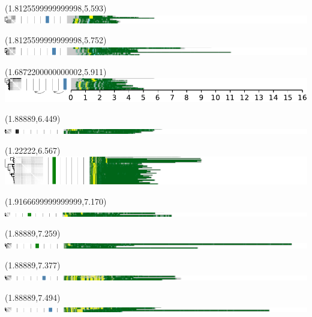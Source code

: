 \documentclass{article}
\begin{document}
\begin{textblock}{13}(1.8125599999999998,5.593)\includegraphics{./Figure_S5/chr11-HG005.pdf}\end{textblock}
\begin{textblock}{13}(1.8125599999999998,5.752)\includegraphics{./Figure_S5/chr11-HG006.pdf}\end{textblock}
\begin{textblock}{13}(1.6872200000000002,5.911)\includegraphics{./Figure_S5/chr11-HG007.pdf}\end{textblock}
\begin{textblock}{13}(1.88889,6.449)\includegraphics{./Figure_S5/chr12-HG001.pdf}\end{textblock}
\begin{textblock}{13}(1.22222,6.567)\includegraphics{./Figure_S5/chr12-HG002.pdf}\end{textblock}
\begin{textblock}{13}(1.9166699999999999,7.170)\includegraphics{./Figure_S5/chr12-HG003.pdf}\end{textblock}
\begin{textblock}{13}(1.88889,7.259)\includegraphics{./Figure_S5/chr12-HG004.pdf}\end{textblock}
\begin{textblock}{13}(1.88889,7.377)\includegraphics{./Figure_S5/chr12-HG005.pdf}\end{textblock}
\begin{textblock}{13}(1.88889,7.494)\includegraphics{./Figure_S5/chr12-HG006.pdf}\end{textblock}
\end{document}
